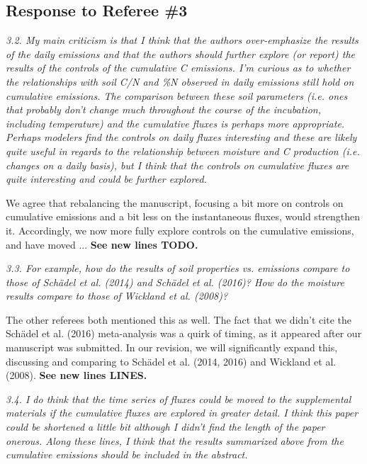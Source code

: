 \documentclass[11pt, oneside]{article}
\begin{document}
\newpage
\subsection*{Response to Referee \#3}

{\it 3.2. My main criticism is that I think that the authors over-emphasize the results of the daily emissions and that the authors should further explore (or report) the results of the controls of the cumulative C emissions. I'm curious as to whether the relationships with soil C/N and \%N observed in daily emissions still hold on cumulative emissions. The comparison between these soil parameters (i.e. ones that probably don't change much throughout the course of the incubation, including temperature) and the cumulative fluxes is perhaps more appropriate. Perhaps modelers find the controls on daily fluxes interesting and these are likely quite useful in regards to the relationship between moisture and C production (i.e. changes on a daily basis), but I think that the controls on cumulative fluxes are quite interesting and could be further explored. }

We agree that rebalancing the manuscript, focusing a bit more on controls on cumulative emissions and a bit less on the instantaneous fluxes, would strengthen it. Accordingly, we now more fully explore controls on the cumulative emissions, and have moved ... {\bf See new lines TODO.}

\medskip
{\it 3.3. For example, how do the results of soil properties vs. emissions compare to those of Schädel et al. (2014) and Schädel et al. (2016)? How do the moisture results compare to those of Wickland et al. (2008)? }

The other referees both mentioned this as well. The fact that we didn't cite the Schädel et al. (2016) meta-analysis was a quirk of timing, as it appeared after our manuscript was submitted. In our revision, we will significantly expand this, discussing and comparing to Schädel et al. (2014, 2016) and Wickland et al. (2008). {\bf See new lines LINES.}

\medskip
{\it 3.4. I do think that the time series of fluxes could be moved to the supplemental materials if the cumulative fluxes are explored in greater detail. I think this paper could be shortened a little bit although I didn't find the length of the paper onerous. Along these lines, I think that the results summarized above from the cumulative emissions should be included in the abstract. }
\end{document}
